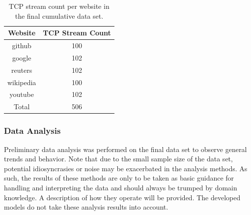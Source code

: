 \documentclass[10pt,sigconf,letterpaper,nonacm]{acmart}
\begin{document}
\begin{table}[h]
  \caption{TCP stream count per website in the final cumulative data set.}
  \label{tab:dataSize}
  \begin{tabular}{cc}
    \toprule
    Website & TCP Stream Count \\
    \midrule
    github & 100 \\
    google & 102 \\
    reuters & 102 \\
    wikipedia & 100 \\
    youtube & 102 \\
    \midrule
    Total & 506 \\
    \bottomrule
  \end{tabular}
\end{table}

\subsubsection{Data Analysis}

Preliminary data analysis was performed on the final data set to observe general trends and behavior.
Note that due to the small sample size of the data set, potential idiosyncrasies or noise may be exacerbated in the analysis methods.
As such, the results of these methods are only to be taken as basic guidance for handling and interpreting the data and should always be trumped by domain knowledge.
A description of how they operate will be provided.
The developed models do not take these analysis results into account.
\end{document}
